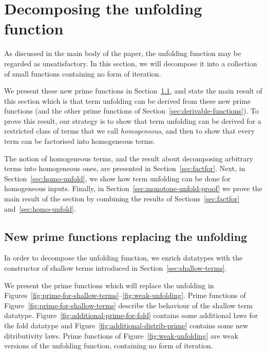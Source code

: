 \section{Decomposing the unfolding function}
\label{ap:matrix-power}
\newcommand{\treeunfold}{\mathrm{unfold}}

As discussed in the main body of the paper, the unfolding function may be regarded as unsatisfactory. In this section, we will decompose it into a collection of small functions containing no form of iteration.   

We present these new prime functions in Section~\ref{sec:functions-decomposing-unfolding}, and state the main result of this section which is that term unfolding  can be derived from these new prime functions (and the other prime functions of Section~\ref{sec:derivable-functions}). To prove this result, our strategy is to show that term unfolding can be derived for a restricted class of terms that we call \emph{homogeneous}, and then to show that every term can be factorised into  homogeneous terms. 

The notion of homogeneous terms, and the result about  decomposing arbitrary terms into homogeneous ones, are presented in Section~\ref{sec:factfor}. Next, in Section~\ref{sec:homo-unfold}, we show how term unfolding can be done for homogeneous inputs. Finally, in Section~\ref{sec:monotone-unfold-proof} we prove the main result of the section by combining  the results of Sections~\ref{sec:factfor} and~\ref{sec:homo-unfold}.

\subsection{New prime functions replacing the unfolding}\label{sec:functions-decomposing-unfolding}
In order to decompose the unfolding function, we enrich datatypes with the constructor of shallow terms introduced in Section~\ref{sec:shallow-terms}. 

We present the prime functions which will replace the unfolding in Figures~\ref{fig:prime-for-shallow-terms}--\ref{fig:weak-unfolding}. Prime functions of Figure~\ref{fig:prime-for-shallow-terms} describe the behaviour of the shallow term datatype. Figure~\ref{fig:additional-prime-for-fold} contains some additional laws for the fold datatype and Figure~\ref{fig:additional-distrib-prime} contains some new ditributivity laws. Prime functions of Figure~\ref{fig:weak-unfolding} are weak versions of the unfolding function, containing no form of iteration. 

